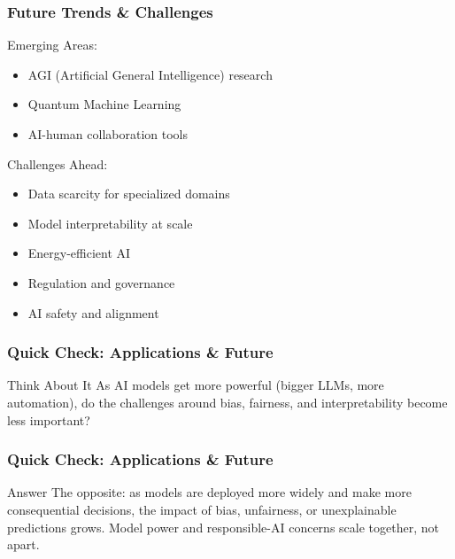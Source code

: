 \begin{frame}[fragile]\frametitle{Future Trends \& Challenges}
Emerging Areas:
\begin{itemize}
\item AGI (Artificial General Intelligence) research
\item Quantum Machine Learning
\item  AI-human collaboration tools
\end{itemize}

Challenges Ahead:
\begin{itemize}
\item Data scarcity for specialized domains
\item Model interpretability at scale
\item Energy-efficient AI
\item Regulation and governance
\item AI safety and alignment
\end{itemize}
\end{frame}

\begin{frame}[fragile]\frametitle{Quick Check: Applications \& Future}
\begin{block}{Think About It}
As AI models get more powerful (bigger LLMs, more automation), do the challenges around bias, fairness, and interpretability become less important?
\end{block}
\end{frame}

\begin{frame}[fragile]\frametitle{Quick Check: Applications \& Future}
\begin{block}{Answer}
The opposite: as models are deployed more widely and make more consequential decisions, the impact of bias, unfairness, or unexplainable predictions grows. Model power and responsible-AI concerns scale together, not apart.
\end{block}
\end{frame}


